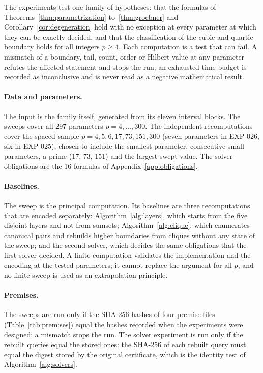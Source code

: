 \documentclass[11pt]{article}
\theoremstyle{definition}
\theoremstyle{remark}
\begin{document}
The experiments test one family of hypotheses: that the formulas of Theorems~\ref{thm:parametrization}
to~\ref{thm:groebner} and Corollary~\ref{cor:degeneration} hold with no exception at every
parameter at which they can be exactly decided, and that the classification of the cubic and
quartic boundary holds for all integers $p\geq4$. Each computation is a test that can fail. A
mismatch of a boundary, tail, count, order or Hilbert value at any parameter refutes the
affected statement and stops the run; an exhausted time budget is recorded as inconclusive and is
never read as a negative mathematical result.

\paragraph{Data and parameters.} The input is the family itself, generated from its eleven
interval blocks. The sweeps cover all $297$ parameters $p=4,\ldots,300$. The independent
recomputations cover the spaced sample $p=4,5,6,17,73,151,300$ (seven parameters in EXP-026,
six in EXP-025), chosen to include the smallest parameter, consecutive small parameters, a
prime ($17$, $73$, $151$) and the largest swept value. The solver obligations are the 16
formulas of Appendix~\ref{app:obligations}.

\paragraph{Baselines.} The sweep is the principal computation. Its baselines are three
recomputations that are encoded separately: Algorithm~\ref{alg:layers}, which starts from the
five disjoint layers and not from sumsets; Algorithm~\ref{alg:clique}, which enumerates canonical
pairs and rebuilds higher boundaries from cliques without any state of the sweep; and the
second solver, which decides the same obligations that the first solver decided. A finite
computation validates the implementation and the encoding at the tested parameters; it cannot
replace the argument for all $p$, and no finite sweep is used as an extrapolation principle.

\paragraph{Premises.} The sweeps are run only if the SHA-256 hashes of four premise files
(Table~\ref{tab:premises}) equal the hashes recorded when the experiments were designed;
a mismatch stops the run. The solver experiment is run only if the rebuilt queries equal the
stored ones: the SHA-256 of each rebuilt query must equal the digest stored by the original
certificate, which is the identity test of Algorithm~\ref{alg:solvers}.
\end{document}
